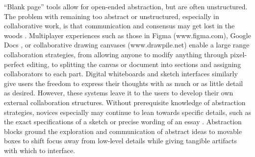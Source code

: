 ``Blank page'' tools allow for open-ended abstraction, but are often unstructured. The problem with remaining too abstract or unstructured, especially in collaborative work, is that communication and consensus may get lost in the woods \cite{hinds1999curse,hinds2001}. Multiplayer experiences such as those in  Figma (www.figma.com), Google Docs \cite{wang2015students}, or collaborative drawing canvases (www.drawpile.net) enable a large range collaboration strategies, from allowing anyone to modify anything through pixel-perfect editing, to splitting the canvas or document into sections and assigning collaborators to each part. Digital whiteboards \cite{Ishii1992} and sketch interfaces \cite{lin2000denim} similarly give users the freedom to express their thoughts with as much or as little detail as desired. However, these systems leave it to the users to develop their own external collaboration structures. Without prerequisite knowledge of abstraction strategies, novices especially may continue to lean towards specific details, such as the exact specifications of a sketch \cite{welch2000sketching} or precise wording of an essay \cite{sommers1980revision}. Abstraction blocks ground the exploration and communication of abstract ideas to movable boxes to shift focus away from low-level details while giving tangible artifacts with which to interface.
